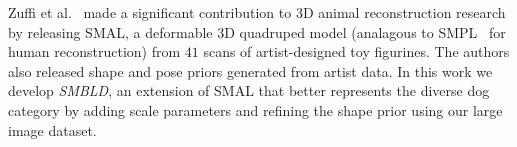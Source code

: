 
Zuffi et al.~\cite{zuffi2017menagerie} made a significant contribution to 3D animal reconstruction research by releasing SMAL, a deformable 3D quadruped model (analagous to SMPL~\cite{loper15smpl} for human reconstruction) from $41$ scans of artist-designed toy figurines. The authors also released shape and pose priors generated from artist data. In this work we develop \emph{SMBLD}, an extension of SMAL that better represents the diverse dog category by adding scale parameters and refining the shape prior using our large image dataset.








